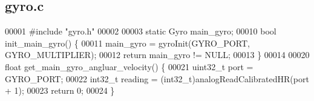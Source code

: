 \subsection{gyro.\+c}
\label{gyro_8c_source}

\begin{DoxyCode}
00001 \textcolor{preprocessor}{#include "gyro.h"}
00002 
00003 \textcolor{keyword}{static} Gyro main_gyro;
00010 \textcolor{keywordtype}{bool} init_main_gyro() \{
00011   main_gyro = gyroInit(GYRO\_PORT, GYRO\_MULTIPLIER);
00012   \textcolor{keywordflow}{return} main_gyro != NULL;
00013 \}
00014 
00020 \textcolor{keywordtype}{float} get_main_gyro_angluar_velocity() \{
00021   uint32\_t port = GYRO\_PORT;
00022   int32\_t reading = (int32\_t)analogReadCalibratedHR(port + 1);
00023   \textcolor{keywordflow}{return} 0;
00024 \}
\end{DoxyCode}
